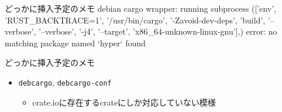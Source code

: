 \documentclass[cjk,dvipdfmx,10pt,compress,t,fragile%
hyperref={bookmarks=true,bookmarksnumbered=true,bookmarksopen=false,%
colorlinks=false,%
pdftitle={第 134 回 関西 Debian 勉強会},%
pdfauthor={小林},%
pdfsubject={資料},%
}]{beamer}
\newenvironment{commandline}%
{\VerbatimEnvironment
  \begin{Sbox}\begin{minipage}{0.9\hsize}\begin{fontsize}{8}{8} \color{white} \begin{BVerbatim}}%
{\end{BVerbatim}\end{fontsize}\end{minipage}\end{Sbox}
  \setlength{\fboxsep}{8pt}

\vspace{6pt}%
\fcolorbox{white}{black}{\TheSbox}

\vspace{3pt}%
}
\begin{document}

\begin{frame}[fragile]{どっかに挿入予定のメモ}
debian cargo wrapper: running subprocess (['env', 'RUST_BACKTRACE=1', '/usr/bin/cargo', '-Zavoid-dev-deps', 'build', '--verbose', '--verbose', '-j4', '--target', 'x86_64-unknown-linux-gnu'],) {}
error: no matching package named `hyper` found
\end{frame}

\begin{frame}[fragile]{どっかに挿入予定のメモ}
 \begin{itemize}
  \item \texttt{debcargo}, \texttt{debcargo-conf}
	\begin{itemize}
	 \item crate.ioに存在するcrateにしか対応していない模様
	\end{itemize}
 \end{itemize}
\end{frame}
\end{document}
